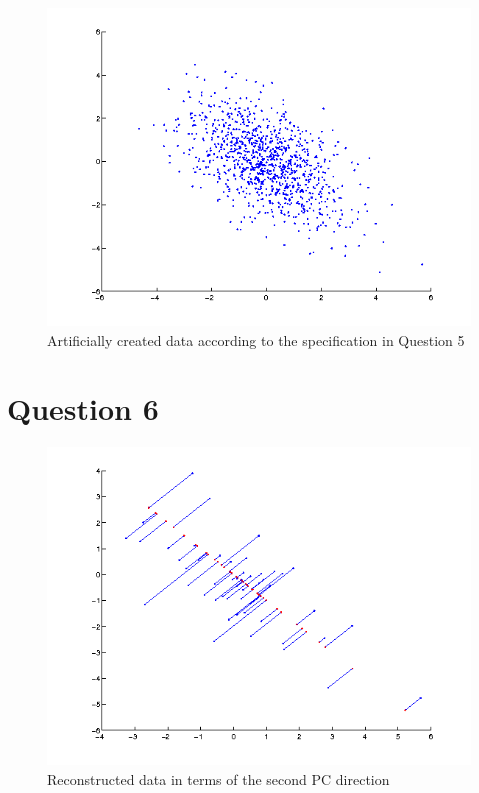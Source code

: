 \documentclass[paper=a4, fontsize=11pt]{scrartcl} %
\numberwithin{equation}{section} %
\numberwithin{figure}{section} %
\numberwithin{table}{section} %
\begin{document}
\begin{figure}[H]
  \centering
  \includegraphics[scale=.7]{artificial_data}
  \caption{Artificially created data according to the specification in Question 5}
\end{figure}


\section {Question 6}

\begin{figure}[H]
  \centering
  \includegraphics[scale=.7]{reconstruction}
  \caption{Reconstructed data in terms of the second PC direction}
\end{figure}
\end{document}
